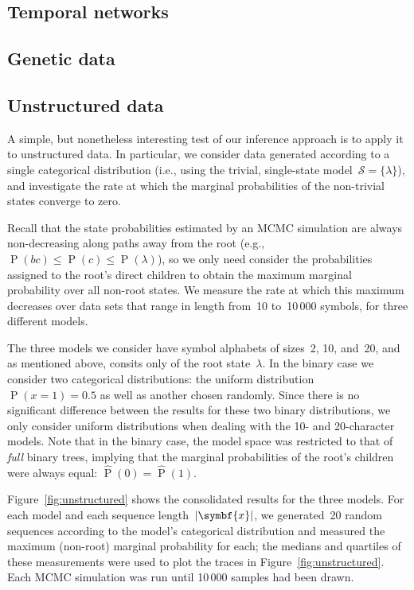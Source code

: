 \documentclass[12pt,a4paper]{article}
\newcommand\mc[1]{\mathcal{#1}}               %
\newcommand\ub[1]{\symbf{#1}}                 %
\DeclareMathOperator\Pb{P}                    %
\DeclarePairedDelimiter\abs{\lvert}{\rvert}   %
\newcommand\peq{\mathop{=}}   %
\begin{document}
\subsection{Temporal networks}\label{sec:temporal networks} %

\subsection{Genetic data}\label{sec:genetic} %

\subsection{Unstructured data}\label{sec:unstructured} %

A simple, but nonetheless interesting test of our inference approach is to apply
it to unstructured data. In particular, we consider data generated according to
a single categorical distribution (i.e., using the trivial, single-state
model~\(\mc{S} = \{\lambda\}\)), and investigate the rate at which the marginal
probabilities of the non-trivial states converge to zero.

Recall that the state probabilities estimated by an MCMC simulation are always
non-decreasing along paths away from the root (e.g., \(\Pb(bc) \le \Pb(c) \le
\Pb(\lambda)\)), so we only need consider the probabilities assigned to the
root's direct children to obtain the maximum marginal probability over all
non-root states. We measure the rate at which this maximum decreases over data
sets that range in length from~10 to~10\,000 symbols, for three different
models.

The three models we consider have symbol alphabets of sizes~2, 10, and~20, and
as mentioned above, consits only of the root state~\(\lambda\). In the binary
case we consider two categorical distributions: the uniform distribution~\(\Pb(x
\peq 1) = 0.5\) as well as another chosen randomly. Since there is no
significant difference between the results for these two binary distributions,
we only consider uniform distributions when dealing with the 10- and
20-character models. Note that in the binary case, the model space was
restricted to that of \emph{full} binary trees, implying that the marginal
probabilities of the root's children were always equal: \(\hat{\Pb}(0) =
\hat{\Pb}(1)\).

Figure~\ref{fig:unstructured} shows the consolidated results for the three
models. For each model and each sequence length~\(\abs{\ub{x}}\), we
generated~20 random sequences according to the model's categorical distribution
and measured the maximum (non-root) marginal probability for each; the medians
and quartiles of these measurements were used to plot the traces in
Figure~\ref{fig:unstructured}. Each MCMC simulation was run until 10\,000
samples had been drawn.
%

\end{document}
